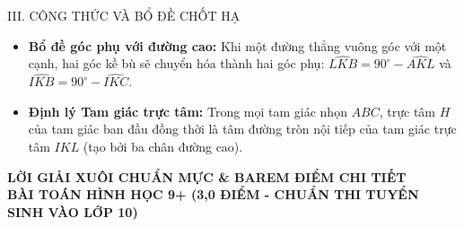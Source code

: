 \documentclass[11pt,a4paper]{article}
\begin{document}
\vspace{1mm}

\begin{formulabox}{III. CÔNG THỨC VÀ BỔ ĐỀ CHỐT HẠ}
\begin{itemize}[leftmargin=*, nosep]
    \item \textbf{Bổ đề góc phụ với đường cao:} Khi một đường thẳng vuông góc với một cạnh, hai góc kề bù sẽ chuyển hóa thành hai góc phụ: $\widehat{LKB} = 90^\circ - \widehat{AKL}$ và $\widehat{IKB} = 90^\circ - \widehat{IKC}$.
    \item \textbf{Định lý Tam giác trực tâm:} Trong mọi tam giác nhọn $ABC$, trực tâm $H$ của tam giác ban đầu đồng thời là tâm đường tròn nội tiếp của tam giác trực tâm $IKL$ (tạo bởi ba chân đường cao).
\end{itemize}
\end{formulabox}

\newpage

\begin{center}
    {\Large\bfseries\color{blue!80!black} LỜI GIẢI XUÔI CHUẨN MỰC \& BAREM ĐIỂM CHI TIẾT}\\[1.5mm]
    {\large\bfseries BÀI TOÁN HÌNH HỌC 9+ (3,0 ĐIỂM - CHUẨN THI TUYỂN SINH VÀO LỚP 10)}
\end{center}

\vspace{1mm}
\end{document}

